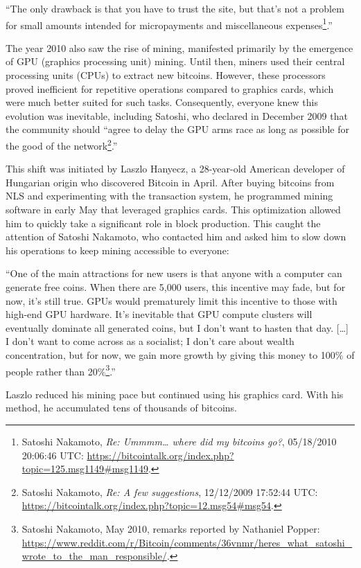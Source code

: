 \documentclass[
  a5paper,
  smalldemyvopaper,10pt,twoside,onecolumn,openright,extrafontsizes,hidelinks]{memoir}
\begin{document}
``The only drawback is that you have to trust the site, but that's not a
problem for small amounts intended for micropayments and miscellaneous
expenses\footnote{Satoshi Nakamoto, \emph{Re: Ummmm\ldots{} where did my
  bitcoins go?}, 05/18/2010 20:06:46 UTC:
  \url{https://bitcointalk.org/index.php?topic=125.msg1149\#msg1149}.}.''

The year 2010 also saw the rise of mining, manifested primarily by the
emergence of GPU (graphics processing unit) mining. Until then, miners
used their central processing units (CPUs) to extract new bitcoins.
However, these processors proved inefficient for repetitive operations
compared to graphics cards, which were much better suited for such
tasks. Consequently, everyone knew this evolution was inevitable,
including Satoshi, who declared in December 2009 that the community
should ``agree to delay the GPU arms race as long as possible for the
good of the network\footnote{Satoshi Nakamoto, \emph{Re: A few
  suggestions}, 12/12/2009 17:52:44 UTC:
  \url{https://bitcointalk.org/index.php?topic=12.msg54\#msg54}.}.''

This shift was initiated by Laszlo Hanyecz, a 28-year-old American
developer of Hungarian origin who discovered Bitcoin in April. After
buying bitcoins from NLS and experimenting with the transaction system,
he programmed mining software in early May that leveraged graphics
cards. This optimization allowed him to quickly take a significant role
in block production. This caught the attention of Satoshi Nakamoto, who
contacted him and asked him to slow down his operations to keep mining
accessible to everyone:

``One of the main attractions for new users is that anyone with a
computer can generate free coins. When there are 5,000 users, this
incentive may fade, but for now, it's still true. GPUs would prematurely
limit this incentive to those with high-end GPU hardware. It's
inevitable that GPU compute clusters will eventually dominate all
generated coins, but I don't want to hasten that day. {[}\ldots{]} I
don't want to come across as a socialist; I don't care about wealth
concentration, but for now, we gain more growth by giving this money to
100\% of people rather than 20\%\footnote{Satoshi Nakamoto, May 2010,
  remarks reported by Nathaniel Popper:
  \url{https://www.reddit.com/r/Bitcoin/comments/36vnmr/heres_what_satoshi_wrote_to_the_man_responsible/}.}.''

Laszlo reduced his mining pace but continued using his graphics card.
With his method, he accumulated tens of thousands of bitcoins.
\end{document}

